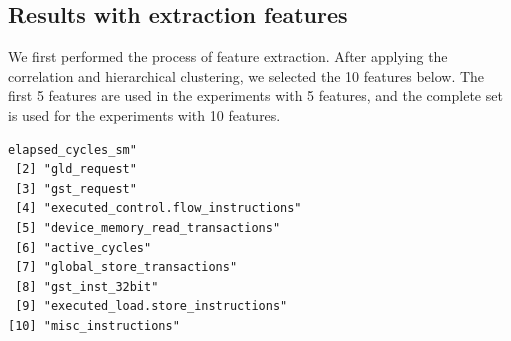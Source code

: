 \begin{table}[htpb]
\centering
{}
\caption{MAPE of the prediction of the second context (in \%).}
\label{tab:MAPE:Rodinia}
\end{table}

\subsection{Results with extraction features}
We first performed the process of feature extraction. After applying the correlation and hierarchical clustering, we selected the 10 features below. The first 5 features are used in the experiments with 5 features, and the complete set is used for the experiments with 10 features.

\begin{lstlisting}[basicstyle=\small,numbers=none]
 elapsed_cycles_sm"                 
 [2] "gld_request"                       
 [3] "gst_request"   
 [4] "executed_control.flow_instructions"
 [5] "device_memory_read_transactions"                         
 [6] "active_cycles"                     
 [7] "global_store_transactions"         
 [8] "gst_inst_32bit"                    
 [9] "executed_load.store_instructions"  
[10] "misc_instructions"  
\end{lstlisting}

